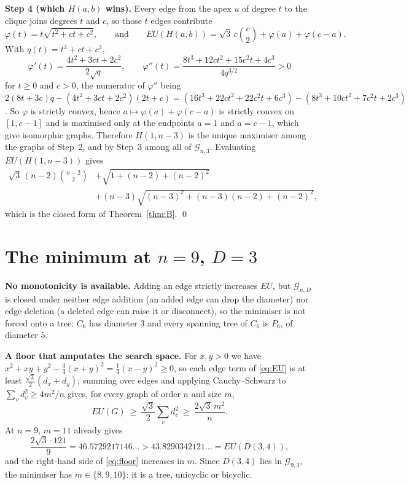 \documentclass[11pt]{amsart}
\theoremstyle{remark}
\newcommand{\EU}{\mathit{EU}}
\newcommand{\Gnd}{\mathcal G}
\begin{document}
\medskip
\noindent\textbf{Step 4 (which $H(a,b)$ wins).}
Every edge from the apex $u$ of degree $t$ to the clique joins degrees $t$ and
$c$, so those $t$ edges contribute
\[
 \varphi(t)=t\sqrt{t^2+ct+c^2},
 \qquad\text{and}\qquad
 \EU(H(a,b))=\sqrt3\,c\binom c2+\varphi(a)+\varphi(c-a).
\]
With $q(t)=t^2+ct+c^2$,
\[
 \varphi'(t)=\frac{4t^2+3ct+2c^2}{2\sqrt q},
 \qquad
 \varphi''(t)=\frac{8t^3+12ct^2+15c^2t+4c^3}{4q^{3/2}}>0
\]
for $t\ge0$ and $c>0$,
the numerator of $\varphi''$ being
$2(8t+3c)q-(4t^2+3ct+2c^2)(2t+c)
 =(16t^3+22ct^2+22c^2t+6c^3)-(8t^3+10ct^2+7c^2t+2c^3)$.
So $\varphi$ is strictly convex, hence $a\mapsto\varphi(a)+\varphi(c-a)$ is
strictly convex on $[1,c-1]$ and is maximised only at the endpoints $a=1$ and
$a=c-1$, which give isomorphic graphs. Therefore $H(1,n-3)$ is the unique
maximiser among the graphs of Step~2, and by Step~3 among all of
$\Gnd_{n,3}$. Evaluating $\EU(H(1,n-3))$ gives
\begin{align*}
 \sqrt3\,(n-2)\binom{n-2}2&+\sqrt{1+(n-2)+(n-2)^2}\\
 &+(n-3)\sqrt{(n-3)^2+(n-3)(n-2)+(n-2)^2},
\end{align*}
which is the closed form of Theorem~\ref{thm:B}. \qed

\section{The minimum at $n=9$, $D=3$}\label{sec:min}

\noindent\textbf{No monotonicity is available.} Adding an edge strictly
increases $\EU$, but $\Gnd_{n,D}$ is closed under neither edge addition (an
added edge can drop the diameter) nor edge deletion (a deleted edge can raise
it or disconnect), so the minimiser is not forced onto a tree: $C_6$ has
diameter $3$ and every spanning tree of $C_6$ is $P_6$, of diameter $5$.

\medskip
\noindent\textbf{A floor that amputates the search space.}
For $x,y>0$ we have $x^2+xy+y^2-\tfrac34(x+y)^2=\tfrac14(x-y)^2\ge0$, so each
edge term of \eqref{eq:EU} is at least $\tfrac{\sqrt3}2(d_x+d_y)$; summing over
edges and applying Cauchy--Schwarz to $\sum_vd_v^2\ge4m^2/n$ gives, for every
graph of order $n$ and size $m$,
\begin{equation}\label{eq:floor}
 \EU(G)\ \ge\ \frac{\sqrt3}{2}\sum_{v}d_v^2\ \ge\ \frac{2\sqrt3\,m^2}{n}.
\end{equation}
At $n=9$, $m=11$ already gives
\[
 \frac{2\sqrt3\cdot121}{9}=46.5729217146\ldots>43.8290342121\ldots=\EU(D(3,4)),
\]
and the right-hand side of \eqref{eq:floor} increases in $m$. Since $D(3,4)$ lies
in $\Gnd_{9,3}$, the minimiser has $m\in\{8,9,10\}$: it is a tree, unicyclic
or bicyclic.
\end{document}
